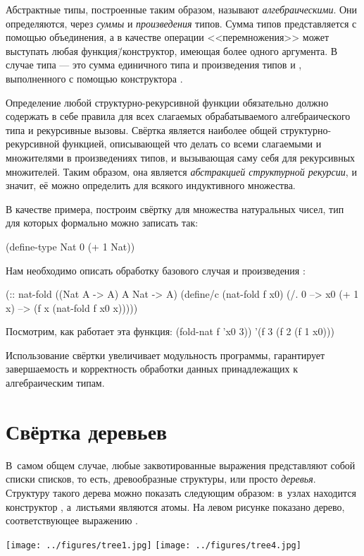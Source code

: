 \noindent
Абстрактные типы, построенные таким образом, называют \emph{алгебраическими}. Они определяются, через \emph{суммы} и \emph{произведения} типов. Сумма типов представляется с помощью объединения, а в качестве операции <<перемножения>> может выступать любая функция\=/конструктор, имеющая более одного аргумента. В случае типа  --- это сумма единичного типа  и произведения типов  и , выполненного с помощью конструктора .

Определение любой структурно-рекурсивной функции обязательно должно содержать в себе правила для всех слагаемых обрабатываемого алгебраического типа и рекурсивные вызовы. Свёртка является наиболее общей структурно-рекурсивной функцией, описывающей что делать со всеми слагаемыми и множителями в произведениях типов, и вызывающая саму себя для рекурсивных множителей.
Таким образом, она является \emph{абстракцией структурной рекурсии}, и значит, её можно определить для всякого индуктивного множества. 

В качестве примера, построим свёртку для множества натуральных чисел, тип для которых формально можно записать так:
\vspace{-\bigskipamount}
\begin{SchemeCode}
(define-type Nat
  0
  (+ 1 Nat))
\end{SchemeCode}

\noindent
Нам необходимо описать обработку базового случая  и произведения :
\begin{Definition}
(:: nat-fold ((Nat A -> A) A Nat -> A)
  (define/c (nat-fold f x0)
    (/. 0 --> x0
        (+ 1 x) --> (f x (nat-fold f x0 x)))))
\end{Definition}
Посмотрим, как работает эта функция:
\REPL
  {(fold-nat f 'x0 3))}
  {'(f 3 (f 2 (f 1 x0)))}

Использование свёртки увеличивает модульность программы, гарантирует завершаемость и корректность обработки данных принадлежащих к алгебраическим типам.

\section[2]{Свёртка деревьев}%
В~самом общем случае, любые заквотированные выражения представляют собой списки списков, то есть, древообразные структуры, или просто \emph{деревья}. Структуру такого дерева можно показать следующим образом: в~узлах находится конструктор , а~листьями являются атомы. На левом рисунке показано дерево, соответствующее выражению .
\begin{center}\label{fig:tree}
  \texttt{[image: ../figures/tree1.jpg]}
  \qquad
  \texttt{[image: ../figures/tree4.jpg]}
\end{center}

